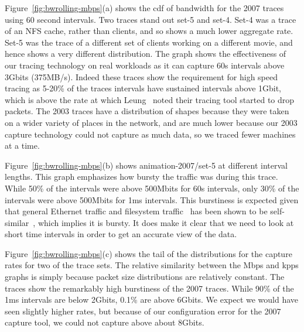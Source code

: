 Figure~\ref{fig:bwrolling-mbps}(a) shows the cdf of bandwidth for the
2007 traces using 60 second intervals.  Two traces stand out set-5 and
set-4.  Set-4 was a trace of an NFS cache, rather than clients, and so
shows a much lower aggregate rate.  Set-5 was the trace of a different
set of clients working on a different movie, and hence shows a very
different distribution.  The graph shows the effectiveness of our
tracing technology on real workloads as it can capture 60s intervals
above 3Gbits (375MB/s).  Indeed these traces show the requirement for
high speed tracing as 5-20\% of the traces intervals have sustained
intervals above 1Gbit, which is above the rate at which
Leung~\cite{LeungUsenix08} noted their tracing tool started to drop
packets.  The 2003 traces have a distribution of shapes because they
were taken on a wider variety of places in the network, and are much
lower because our 2003 capture technology could not capture as much
data, so we traced fewer machines at a time.

Figure~\ref{fig:bwrolling-mbps}(b) shows animation-2007/set-5 at different
interval lengths.  This graph emphasizes how bursty the traffic was
during this trace. While 50\% of the intervals were above 500Mbits for
60s intervals, only 30\% of the intervals were above 500Mbits for 1ms
intervals.  This burstiness is expected given that
general Ethernet traffic and filesystem
traffic~\cite{Gribble98selfsimilar} has been shown to be
self-similar~\cite{Leland94selfsimilar}, which implies it is bursty.
It does make it clear that we need to look at short time intervals in
order to get an accurate view of the data.

Figure~\ref{fig:bwrolling-mbps}(c) shows the tail of the distributions for
the capture rates for two of the trace sets.  The relative similarity
between the Mbps and kpps graphs is simply because packet size
distributions are relatively constant.  The traces show the remarkably high
burstiness of the 2007 traces.  While 90\% of the 1ms intervals are
below 2Gbits, 0.1\% are above 6Gbits.  We expect we would have seen
slightly higher rates, but because of our configuration error for the
2007 capture tool, we could not capture above about 8Gbits.

\begin{figure*}
\caption{Bandwidth measured in the collection process.  In figure (b),
animation-2007/set-5 at different intervals is the top group of 4 lines, and
animation-2003/set-12 is the bottom group of 4 lines. animation-2003/set-12 does not go
all the way to the right at 60s intervals because there were
insufficient data points for the 0.9999 quantile.}
\label{fig:bwrolling-mbps}
\end{figure*}

